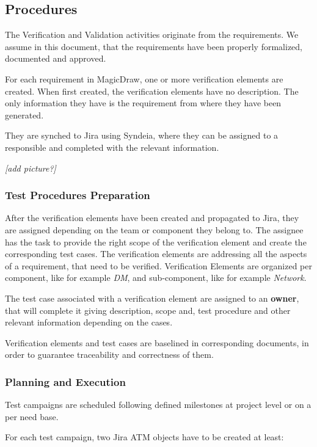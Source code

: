 \subsection{Procedures}

The Verification and Validation activities originate from the requirements.
We assume in this document, that the requirements have been properly formalized, documented and approved.

For each requirement in MagicDraw, one or more verification elements are created.
When first created, the verification elements have no description. The only information they have is the requirement from where they have been generated.

They are synched to Jira using Syndeia, where they can be assigned to a responsible and completed with the relevant information.

\textit{[add picture?]}


\subsubsection{Test Procedures Preparation}

After the verification elements have been created and propagated to Jira, they are assigned depending on the team or
component they belong to.
The assignee has the task to provide the right scope of the verification element and create the corresponding test cases.
The verification elements are addressing all the aspects of a  requirement, that need to be verified.
Verification Elements are organized per component, like for example \textit{DM}, and sub-component, like for example \textit{Network}. 

The test case associated with a verification element are assigned to an \textbf{owner},  that will complete it giving description,
 scope and, test procedure and other relevant information depending on the cases.

Verification elements and test cases are baselined in corresponding documents, in order to guarantee traceability and correctness of them.


\subsubsection{Planning and Execution}

Test campaigns are scheduled following defined milestones at project level or on a per need base.

For each test campaign, two Jira ATM objects have to be created at least:

